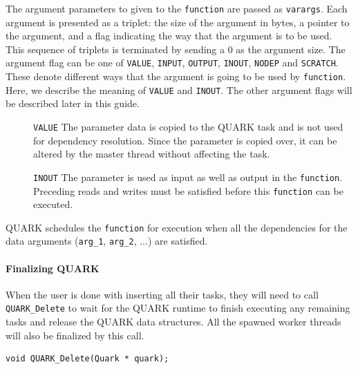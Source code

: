 \documentclass[11pt,letterpaper]{report}
\begin{document}
The argument parameters to given to the \verb|function| are passed as
\verb|varargs|.  Each argument is presented as a triplet: the size of
the argument in bytes, a pointer to the argument, and a flag
indicating the way that the argument is to be used.  This sequence of
triplets is terminated by sending a 0 as the argument size.  The
argument flag can be one of \verb|VALUE|, \verb|INPUT|, \verb|OUTPUT|,
\verb|INOUT|, \verb|NODEP| and \verb|SCRATCH|.  These denote different
ways that the argument is going to be used by \verb|function|.  Here,
we describe the meaning of \verb|VALUE| and \verb|INOUT|.  The other
argument flags will be described later in this guide.
\begin{description}
\item[]\verb|VALUE| The parameter data is copied to the QUARK task and
  is not used for dependency resolution.  Since the parameter is
  copied over, it can be altered by the master thread without
  affecting the task.
\item[]\verb|INOUT| The parameter is used as input as well as output
  in the \verb|function|.  Preceding reads and writes must be
  satisfied before this \verb|function| can be executed.
\end{description}
QUARK schedules the \verb|function| for execution when all the
dependencies for the data arguments (\verb|arg_1|, \verb|arg_2|, ...)
are satisfied.

\paragraph{Finalizing QUARK}
When the user is done with inserting all their tasks, they will need to
call \verb|QUARK_Delete| to wait for the QUARK runtime to finish
executing any remaining tasks and release the QUARK data structures.
All the spawned worker threads will also be finalized by this call.
\begin{samepage}
\begin{lstlisting}
void QUARK_Delete(Quark * quark);
\end{lstlisting}
\end{samepage}
\end{document}
